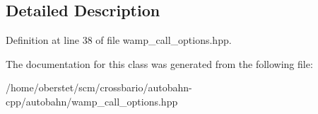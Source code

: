 \subsection{Detailed Description}


Definition at line 38 of file wamp\+\_\+call\+\_\+options.\+hpp.



The documentation for this class was generated from the following file\+:\begin{DoxyCompactItemize}
\item 
/home/oberstet/scm/crossbario/autobahn-\/cpp/autobahn/wamp\+\_\+call\+\_\+options.\+hpp\end{DoxyCompactItemize}
